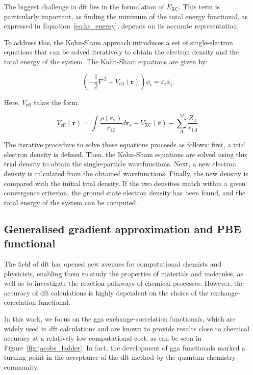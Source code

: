 The biggest challenge in \ac{dft} lies in the formulation of $E_{\text{XC}}$. This term is particularly important, as finding the minimum of the total energy functional, as expressed in Equation~\ref{eq:ks_energy}, depends on its accurate representation.

To address this, the Kohn-Sham approach introduces a set of single-electron equations that can be solved iteratively to obtain the electron density and the total energy of the system. The Kohn-Sham equations are given by:

\begin{equation}
    \left( -\frac{1}{2} \nabla^2 + V_{\text{eff}}(\mathbf{r}) \right) \phi_i = \varepsilon_i \phi_i
    \label{eq:ks_equations}
\end{equation}

Here, $V_{\text{eff}}$ takes the form:

\begin{equation}
    V_{\text{eff}}(\mathbf{r}) = \int \frac{\rho(\mathbf{r}_2)}{r_{12}} d\mathbf{r}_2 + V_{\text{XC}}(\mathbf{r}) - \sum_{A}^{M} \frac{Z_A}{r_{1A}}
    \label{eq:v_eff}
\end{equation}

The iterative procedure to solve these equations proceeds as follows: first, a trial electron density is defined. Then, the Kohn-Sham equations are solved using this trial density to obtain the single-particle wavefunctions. Next, a new electron density is calculated from the obtained wavefunctions. Finally, the new density is compared with the initial trial density. If the two densities match within a given convergence criterion, the ground state electron density has been found, and the total energy of the system can be computed.



\subsection{Generalised gradient approximation and PBE functional}
The field of \ac{dft} has opened new avenues for computational chemists and physicists, enabling them to study the properties of materials and molecules, as well as to investigate the reaction pathways of chemical processes. However, the accuracy of \ac{dft} calculations is highly dependent on the choice of the exchange-correlation functional.

In this work, we focus on the \ac{gga} exchange-correlation functionals, which are widely used in \ac{dft} calculations and are known to provide results close to chemical accuracy at a relatively low computational cost, as can be seen in Figure~\ref{fig:jacobs_ladder}. In fact, the development of \ac{gga} functionals marked a turning point in the acceptance of the \ac{dft} method by the quantum chemistry community.

